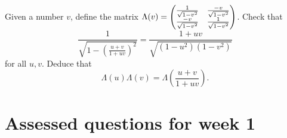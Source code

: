 \documentclass{article}
\begin{document}
\begin{Exercise}\label{exr:lorentz}
Given a number \(v\), define the matrix \(\Lambda(v)=\begin{pmatrix}
\frac{1}{\sqrt{1-v^2}} & \frac{-v}{\sqrt{1-v^2}}
\\ \frac{-v}{\sqrt{1-v^2}} & \frac{1}{\sqrt{1-v^2}}\end{pmatrix}\). Check that
\[\frac{1}{\sqrt{1-\left(\frac{u+v}{1+uv}\right)^2}}=\frac{1+uv}{\sqrt{(1-u^2)(1-v^2)}}\]
for all \(u,v\). Deduce that
\[\Lambda(u)\Lambda(v)=\Lambda\left(\frac{u+v}{1+uv}\right).\]


\end{Exercise}


\newpage


\section{Assessed questions for week 1}


\setcounter{section}{1}
\end{document}
